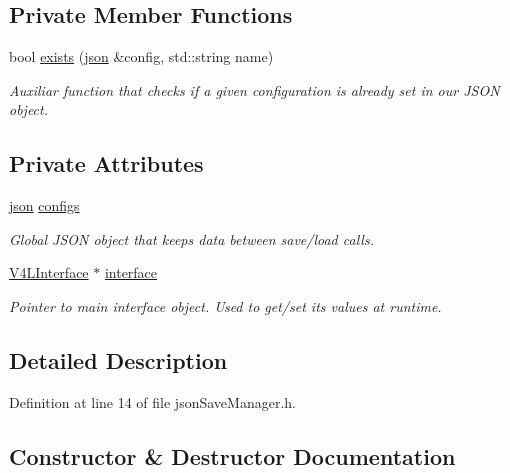\subsection*{Private Member Functions}
\begin{DoxyCompactItemize}
\item 
bool \hyperlink{classjson_save_manager_a850cd6da63a9b10437c1dc7424dfee13}{exists} (\hyperlink{json_save_manager_8h_ab701e3ac61a85b337ec5c1abaad6742d}{json} \&config, std\+::string name)
\begin{DoxyCompactList}\small\item\em Auxiliar function that checks if a given configuration is already set in our J\+S\+ON object. \end{DoxyCompactList}\end{DoxyCompactItemize}
\subsection*{Private Attributes}
\begin{DoxyCompactItemize}
\item 
\hyperlink{json_save_manager_8h_ab701e3ac61a85b337ec5c1abaad6742d}{json} \hyperlink{classjson_save_manager_acfbca58deba9ed712131c20a8f965dfd}{configs}
\begin{DoxyCompactList}\small\item\em Global J\+S\+ON object that keeps data between save/load calls. \end{DoxyCompactList}\item 
\hyperlink{class_v_s_s_s___g_u_i_1_1_v4_l_interface}{V4\+L\+Interface} $\ast$ \hyperlink{classjson_save_manager_a91983cf64bdd03c74cd6d4576cb521cf}{interface}
\begin{DoxyCompactList}\small\item\em Pointer to main interface object. Used to get/set it\textquotesingle{}s values at runtime. \end{DoxyCompactList}\end{DoxyCompactItemize}


\subsection{Detailed Description}


Definition at line 14 of file json\+Save\+Manager.\+h.



\subsection{Constructor \& Destructor Documentation}
\mbox{\label{classjson_save_manager_a1fdb652ff4085dbe3c563b47b850e68e}} 
